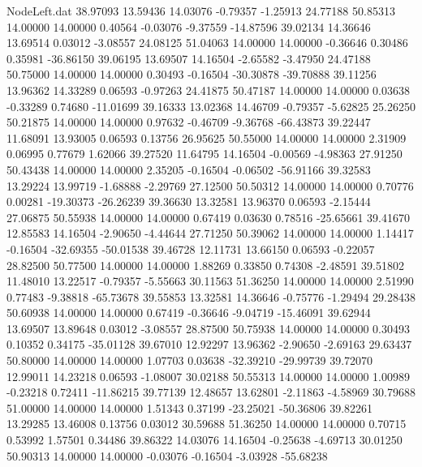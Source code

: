 \begin{filecontents}{NodeLeft.dat}
  38.97093   13.59436   14.03076    -0.79357   -1.25913   24.77188   50.85313   14.00000   14.00000    0.40564   -0.03076   -9.37559  -14.87596
  39.02134   14.36646   13.69514     0.03012   -3.08557   24.08125   51.04063   14.00000   14.00000   -0.36646    0.30486    0.35981  -36.86150
  39.06195   13.69507   14.16504    -2.65582   -3.47950   24.47188   50.75000   14.00000   14.00000    0.30493   -0.16504  -30.30878  -39.70888
  39.11256   13.96362   14.33289     0.06593   -0.97263   24.41875   50.47187   14.00000   14.00000    0.03638   -0.33289    0.74680  -11.01699
  39.16333   13.02368   14.46709    -0.79357   -5.62825   25.26250   50.21875   14.00000   14.00000    0.97632   -0.46709   -9.36768  -66.43873
  39.22447   11.68091   13.93005     0.06593    0.13756   26.95625   50.55000   14.00000   14.00000    2.31909    0.06995    0.77679    1.62066
  39.27520   11.64795   14.16504    -0.00569   -4.98363   27.91250   50.43438   14.00000   14.00000    2.35205   -0.16504   -0.06502  -56.91166
  39.32583   13.29224   13.99719    -1.68888   -2.29769   27.12500   50.50312   14.00000   14.00000    0.70776    0.00281  -19.30373  -26.26239
  39.36630   13.32581   13.96370     0.06593   -2.15444   27.06875   50.55938   14.00000   14.00000    0.67419    0.03630    0.78516  -25.65661
  39.41670   12.85583   14.16504    -2.90650   -4.44644   27.71250   50.39062   14.00000   14.00000    1.14417   -0.16504  -32.69355  -50.01538
  39.46728   12.11731   13.66150     0.06593   -0.22057   28.82500   50.77500   14.00000   14.00000    1.88269    0.33850    0.74308   -2.48591
  39.51802   11.48010   13.22517    -0.79357   -5.55663   30.11563   51.36250   14.00000   14.00000    2.51990    0.77483   -9.38818  -65.73678
  39.55853   13.32581   14.36646    -0.75776   -1.29494   29.28438   50.60938   14.00000   14.00000    0.67419   -0.36646   -9.04719  -15.46091
  39.62944   13.69507   13.89648     0.03012   -3.08557   28.87500   50.75938   14.00000   14.00000    0.30493    0.10352    0.34175  -35.01128
  39.67010   12.92297   13.96362    -2.90650   -2.69163   29.63437   50.80000   14.00000   14.00000    1.07703    0.03638  -32.39210  -29.99739
  39.72070   12.99011   14.23218     0.06593   -1.08007   30.02188   50.55313   14.00000   14.00000    1.00989   -0.23218    0.72411  -11.86215
  39.77139   12.48657   13.62801    -2.11863   -4.58969   30.79688   51.00000   14.00000   14.00000    1.51343    0.37199  -23.25021  -50.36806
  39.82261   13.29285   13.46008     0.13756    0.03012   30.59688   51.36250   14.00000   14.00000    0.70715    0.53992    1.57501    0.34486
  39.86322   14.03076   14.16504    -0.25638   -4.69713   30.01250   50.90313   14.00000   14.00000   -0.03076   -0.16504   -3.03928  -55.68238

\end{filecontents}
